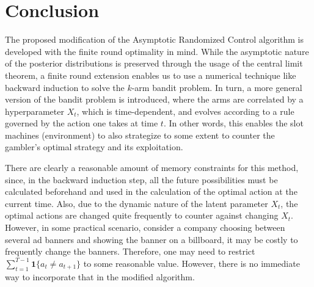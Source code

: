 \documentclass[11pt]{article}
\newcommand{\ind}[1]{\boldsymbol{1}\{#1\}}
\begin{document}
\section{Conclusion}

The proposed modification of the Asymptotic Randomized Control algorithm is developed with the finite round optimality in mind. While the asymptotic nature of the posterior distributions is preserved through the usage of the central limit theorem, a finite round extension enables us to use a numerical technique like backward induction to solve the $k$-arm bandit problem. In turn, a more general version of the bandit problem is introduced, where the arms are correlated by a hyperparameter $X_t$, which is time-dependent, and evolves according to a rule governed by the action one takes at time $t$. In other words, this enables the slot machines (environment) to also strategize to some extent to counter the gambler's optimal strategy and its exploitation.

There are clearly a reasonable amount of memory constraints for this method, since, in the backward induction step, all the future possibilities must be calculated beforehand and used in the calculation of the optimal action at the current time. Also, due to the dynamic nature of the latent parameter $X_t$, the optimal actions are changed quite frequently to counter against changing $X_t$. However, in some practical scenario, consider a company choosing between several ad banners and showing the banner on a billboard, it may be costly to frequently change the banners. Therefore, one may need to restrict $\sum_{t=1}^{T-1} \ind{a_t \neq a_{t+1}}$ to some reasonable value. However, there is no immediate way to incorporate that in the modified algorithm.




\end{document}
